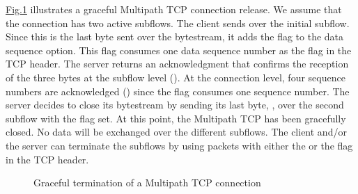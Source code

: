 \documentclass[letterpaper,10pt,english]{sphinxmanual}
\begin{document}
\sphinxAtStartPar
\hyperref[\detokenize{mptcp:fig-mptcp-close}]{Fig.\@ \ref{\detokenize{mptcp:fig-mptcp-close}}} illustrates a graceful Multipath TCP connection release. We assume that the connection has two active subflows. The client sends  over the initial subflow. Since this is the last byte sent over the bytestream, it adds the  flag to the data sequence option. This flag consumes one data sequence number as the  flag in the TCP header. The server returns an acknowledgment that confirms the reception of the three bytes at the subflow level (). At the connection level, four sequence numbers are acknowledged () since the  flag consumes one sequence number. The server decides to close its bytestream by sending its last byte, , over the second subflow with the  flag set. At this point, the Multipath TCP has been gracefully closed. No data will be exchanged over the different subflows. The client and/or the server can terminate the subflows by using packets with either the  or the  flag in the TCP header.
\begin{figure}[htbp]\centering\capstart{}\caption{Graceful termination of a Multipath TCP connection}\label{\detokenize{mptcp:id73}}\label{\detokenize{mptcp:fig-mptcp-close}}\end{figure}
\end{document}
